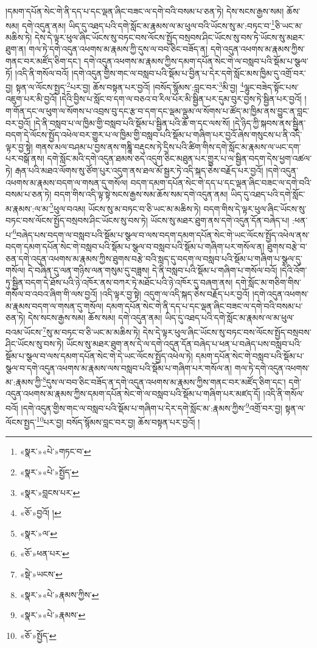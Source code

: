 །དམག་དཔོན་སེང་གེ་ནི་དད་པ་དང་ལྡན་ཞིང་བཟང་ལ་དགེ་བའི་བསམ་པ་ཅན་ཏེ། དེས་སངས་རྒྱས་སམ། ཆོས་སམ། དགེ་འདུན་ནམ། ཡིད་དུ་འཐད་པའི་དགེ་སློང་མ་རྣམས་ལ་མ་ཕུལ་བའི་ཡོངས་སུ་མ་:བཏང་བ་\footnote{«སྣར་»«པེ་»གཏང་བ་}ཅི་ཡང་མ་མཆིས་ཏེ། དེས་དེ་ལྟར་ཕུལ་ཞིང་ཡོངས་སུ་བཏང་བས་ལོངས་སྤྱོད་བསྲབས་ཤིང་ཡོངས་སུ་བས་ཏེ་ཡོངས་སུ་མཐར་ཐུག་ན། གལ་ཏེ་དགེ་འདུན་འཕགས་མ་རྣམས་ཀྱི་དུས་ལ་བབ་ཅིང་བཟོད་ན། དགེ་འདུན་འཕགས་མ་རྣམས་ཀྱིས་གནང་བར་མཛོད་ཅིག་དང་། དགེ་འདུན་འཕགས་མ་རྣམས་ཀྱིས་དམག་དཔོན་སེང་གེ་ལ་བསླབ་པའི་སྡོམ་པ་སྩལ་ཏོ། །འདི་ནི་གསོལ་བའོ། །དགེ་འདུན་གྱིས་གང་ལ་བསླབ་པའི་སྡོམ་པ་བྱིན་པ་དེར་དགེ་སློང་མས་ཁྱིམ་དུ་འགྲོ་བར་བྱ། སྟན་ལ་ལོངས་སྤྱད་\footnote{«སྣར་»«པེ་»སྤྱོད་}པར་བྱ། ཆོས་བསྟན་པར་བྱའོ། །བསོད་སྙོམས་:བླང་བར་\footnote{«སྣར་»བླངས་པར་}མི་བྱ། \footnote{«ཅོ་»བྱའོ། ། }ལྷུང་བཟེད་སྟོང་པས་འཇུག་པར་མི་བྱའོ། །དེའི་བྱིས་པ་སློང་བ་དག་ལ་བཅའ་བ་རིལ་པོར་མི་སྦྱིན་པར་དུམ་བུར་བྱས་ཏེ་སྦྱིན་པར་བྱའོ། །ག་གོན་དང་ལ་ཕུག་ལ་སོགས་པ་འབྲས་བུ་དང་རྩ་བ་དག་དང་ལྡམ་ལྡུམ་ལ་སོགས་པ་ཚོད་མ་ཁྱིམ་ནས་བྱུང་ན་བླང་བར་བྱའོ། །དེ་ནི་བསླབ་པ་ལ་ཁྱིམ་གྱི་བསླབ་པའི་སྡོམ་པ་སྦྱིན་པའི་ཆོ་ག་དང་ལས་སོ། །དེ་ཉིད་ཀྱི་སྐབས་ནས་སྦྱིན་བདག་དེ་ལོངས་སྤྱོད་འཕེལ་བར་གྱུར་པ་ལ་ཁྱིམ་གྱི་བསླབ་པའི་སྡོམ་པ་གཞིག་པར་བྱའོ་ཞེས་གསུངས་པ་ནི་འདི་ལྟར་བྱ་སྟེ། གནས་མལ་བཤམ་པ་བྱས་ནས་གཎྜཱི་བརྡུངས་ཏེ་དྲིས་པའི་ཚིག་གིས་དགེ་སློང་མ་རྣམས་ལ་ཡང་དག་པར་བསྒོ་ནས། དགེ་སློང་མའི་དགེ་འདུན་ཐམས་ཅད་འདུག་ཅིང་མཐུན་པར་གྱུར་པ་ལ་སྦྱིན་བདག་དེས་ཕྱག་འཚལ་ཏེ། རྒན་པའི་མཐའ་ལོགས་སུ་ཙོག་པུར་འདུག་ནས་ཐལ་མོ་སྦྱར་ཏེ་འདི་སྐད་ཅེས་བརྗོད་པར་བྱའོ། །དགེ་འདུན་འཕགས་མ་རྣམས་བདག་ལ་གསན་དུ་གསོལ། བདག་དམག་དཔོན་སེང་གེ་དད་པ་དང་ལྡན་ཞིང་བཟང་ལ་དགེ་བའི་བསམ་པ་ཅན་ཏེ། བདག་གིས་འདི་ལྟ་སྟེ་སངས་རྒྱས་སམ་ཆོས་སམ་དགེ་འདུན་ནམ། ཡིད་དུ་འཐད་པའི་དགེ་སློང་མ་རྣམས་:ལ་མ་\footnote{«སྣར་»ལ་}ཕུལ་བའམ། ཡོངས་སུ་མ་བཏང་བ་ཅི་ཡང་མ་མཆིས་ཏེ། བདག་གིས་དེ་ལྟར་ཕུལ་ཞིང་ཡོངས་སུ་བཏང་བས་ལོངས་སྤྱོད་བསྲབས་ཤིང་ཡོངས་སུ་བས་ཏེ། ཡོངས་སུ་མཐར་ཐུག་ནས་དགེ་འདུན་དོན་བཞེད་པ། :ཕན་པ་\footnote{«ཅོ་»ཕན་པར་}བཞེད་པས་བདག་ལ་བསླབ་པའི་སྡོམ་པ་སྩལ་བ་ལས་བདག་དམག་དཔོན་སེང་གེ་ཡང་ལོངས་སྤྱོད་འཕེལ་ནས་བདག་དམག་དཔོན་སེང་གེ་བསླབ་པའི་སྡོམ་པ་སྩལ་བ་བསླབ་པའི་སྡོམ་པ་གཞིག་པར་གསོལ་ན། ཐུགས་བརྩེ་བ་ཅན་དགེ་འདུན་འཕགས་མ་རྣམས་ཀྱིས་ཐུགས་བརྩེ་བའི་སླད་དུ་བདག་ལ་བསླབ་པའི་སྡོམ་པ་གཞིག་པ་སྩལ་དུ་གསོལ། དེ་བཞིན་དུ་ལན་གཉིས་ལན་གསུམ་དུ་བཟླས། དེ་ནི་བསླབ་པའི་སྡོམ་པ་གཞིག་པ་གསོལ་བའོ། །དེའི་འོག་ཏུ་སྦྱིན་བདག་དེ་ཐོས་པའི་ཉེ་འཁོར་ནས་བཀར་ཏེ་མཐོང་པའི་ཉེ་འཁོར་དུ་བཞག་ནས། དགེ་སློང་མ་གཅིག་གིས་གསོལ་བ་འབའ་ཞིག་གི་ལས་བྱའོ། །འདི་ལྟར་བྱ་སྟེ། འདུག་ལ་འདི་སྐད་ཅེས་བརྗོད་པར་བྱའོ། །དགེ་འདུན་འཕགས་མ་རྣམས་བདག་ལ་གསན་དུ་གསོལ། དམག་དཔོན་སེང་གེ་ནི་དད་པ་དང་ལྡན་ཞིང་བཟང་ལ་དགེ་བའི་བསམ་པ་ཅན་ཏེ། དེས་སངས་རྒྱས་སམ། ཆོས་སམ། དགེ་འདུན་ནམ། ཡིད་དུ་འཐད་པའི་དགེ་སློང་མ་རྣམས་ལ་མ་ཕུལ་བའམ་ཡོངས་\footnote{«སྡེ་»ཡངས་}སུ་མ་བཏང་བ་ཅི་ཡང་མ་མཆིས་ཏེ། དེས་དེ་ལྟར་ཕུལ་ཞིང་ཡོངས་སུ་བཏང་བས་ལོངས་སྤྱོད་བསྲབས་ཤིང་ཡོངས་སུ་བས་ཏེ། ཡོངས་སུ་མཐར་ཐུག་ནས་དེ་ལ་དགེ་འདུན་དོན་བཞེད་པ་ཕན་པ་བཞེད་པས་བསླབ་པའི་སྡོམ་པ་སྩལ་བ་ལས་དམག་དཔོན་སེང་གེ་དེ་ཡང་ལོངས་སྤྱོད་འཕེལ་ཏེ། དམག་དཔོན་སེང་གེ་བསླབ་པའི་སྡོམ་པ་སྩལ་བ་དགེ་འདུན་འཕགས་མ་རྣམས་ལས་བསླབ་པའི་སྡོམ་པ་གཞིག་པར་གསོལ་ན། གལ་ཏེ་དགེ་འདུན་འཕགས་མ་:རྣམས་ཀྱི་\footnote{«སྣར་»«པེ་»རྣམས་ཀྱིས་}དུས་ལ་བབ་ཅིང་བཟོད་ན་དགེ་འདུན་འཕགས་མ་རྣམས་ཀྱིས་གནང་བར་མཛོད་ཅིག་དང་། དགེ་འདུན་འཕགས་མ་རྣམས་ཀྱིས་དམག་དཔོན་སེང་གེ་ལ་བསླབ་པའི་སྡོམ་པ་གཞིག་པར་མཛད་དོ། །འདི་ནི་གསོལ་བའོ། །དགེ་འདུན་གྱིས་གང་ལ་བསླབ་པའི་སྡོམ་པ་གཞིག་པ་དེར་དགེ་སློང་མ་:རྣམས་ཀྱིས་\footnote{«སྣར་»«པེ་»རྣམས་}འགྲོ་བར་བྱ། སྟན་ལ་ལོངས་སྤྱད་\footnote{«ཅོ་»སྤྱོད་}པར་བྱ། བསོད་སྙོམས་བླང་བར་བྱ། ཆོས་བསྟན་པར་བྱའོ། །
